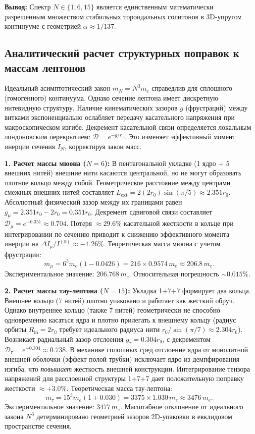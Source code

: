 \documentclass[11pt,a4paper]{article}
\begin{document}
	\textbf{Вывод:} Спектр $N \in \{1, 6, 15\}$ является единственным математически разрешенным множеством стабильных тороидальных солитонов в 3D-упругом континууме с геометрией $\alpha \approx 1/137$.
	
	\subsection{Аналитический расчет структурных поправок к массам лептонов}
	\label{frustration}
	Идеальный асимптотический закон $m_N = N^3 m_e$ справедлив для сплошного (гомогенного) континуума. Однако сечение лептона имеет дискретную нитевидную структуру. Наличие кинематических зазоров $g$ (фрустраций) между витками экспоненциально ослабляет передачу касательного напряжения при макроскопическом изгибе. Декремент касательной связи определяется локальным лондоновским перекрытием: $\mathcal{D} = e^{-g / r_0}$. Это изменяет эффективный момент инерции сечения $I_N$, корректируя закон масс.
	
	\textbf{1. Расчет массы мюона ($N=6$):} 
	В пентагональной укладке (1 ядро + 5 внешних нитей) внешние нити касаются центральной, но не могут образовать плотное кольцо между собой. Геометрическое расстояние между центрами смежных внешних нитей составляет $L_{\text{ext}} = 2(2r_0) \sin(\pi/5) \approx 2.351 r_0$. Абсолютный физический зазор между их границами равен $g_\mu = 2.351 r_0 - 2 r_0 = 0.351 r_0$. 
	Декремент сдвиговой связи составляет $\mathcal{D}_\mu = e^{-0.351} \approx 0.704$. 
	Потеря $\approx 29.6\%$ касательной жесткости в кольце при интегрировании по сечению приводит к снижению эффективного момента инерции на $\Delta I_\mu / I^{(0)} \approx -4.26\%$. 
	Теоретическая масса мюона с учетом фрустрации:
	\begin{equation}
		m_\mu = 6^3 m_e (1 - 0.0426) = 216 \times 0.9574 \, m_e \approx 206.8 \, m_e.
	\end{equation}
	Экспериментальное значение: $206.768 \, m_e$. Относительная погрешность $\sim 0.015\%$.
	
	\textbf{2. Расчет массы тау-лептона ($N=15$):}
	Укладка 1+7+7 формирует два кольца. Внешнее кольцо (7 нитей) плотно упаковано и работает как жесткий обруч. Однако внутреннее кольцо (также 7 нитей) геометрически не способно одновременно касаться ядра и плотно прилегать к внешнему кольцу (радиус орбиты $R_{\text{in}} = 2r_0$ требует идеального радиуса нити $r_0 / \sin(\pi/7) \approx 2.304 r_0$). Возникает радиальный зазор отслоения $g_\tau = 0.304 r_0$, с декрементом $\mathcal{D}_\tau = e^{-0.304} \approx 0.738$.
	В механике сплошных сред отслоение ядра от монолитной внешней оболочки (эффект полой трубки) исключает ядро из демпфирования изгиба, что \textit{повышает} жесткость внешней конструкции. Интегрирование тензора напряжений для расслоенной структуры 1+7+7 дает положительную поправку жесткости $\approx +3.0\%$.
	Теоретическая масса тау-лептона:
	\begin{equation}
		m_\tau = 15^3 m_e (1 + 0.030) = 3375 \times 1.030 \, m_e \approx 3476 \, m_e.
	\end{equation}
	Экспериментальное значение: $3477 \, m_e$. 
	Масштабное отклонение от идеального закона $N^3$ детерминировано геометрией зазоров 2D-упаковки в евклидовом пространстве сечения.
	
\end{document}
